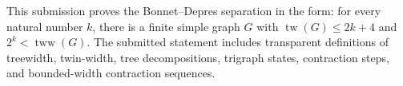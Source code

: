 This submission proves the Bonnet--Depres separation in the form: for every natural number $k$, there is a finite simple graph $G$ with $\operatorname{tw}(G)\le 2k+4$ and $2^k<\operatorname{tww}(G)$. The submitted statement includes transparent definitions of treewidth, twin-width, tree decompositions, trigraph states, contraction steps, and bounded-width contraction sequences.
